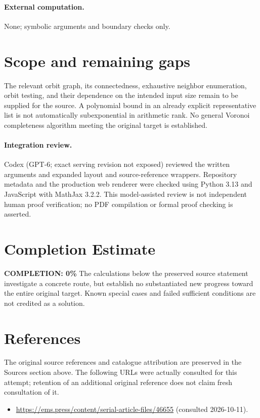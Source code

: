 \documentclass[11pt]{article}
\begin{document}
\paragraph{External computation.} None; symbolic arguments and boundary checks only.
\section{Scope and remaining gaps}
The relevant orbit graph, its connectedness, exhaustive neighbor enumeration, orbit testing, and their dependence on the intended input size remain to be supplied for the source. A polynomial bound in an already explicit representative list is not automatically subexponential in arithmetic rank. No general Voronoi completeness algorithm meeting the original target is established.
\paragraph{Integration review.} Codex (GPT-6; exact serving revision not exposed) reviewed the written arguments and expanded layout and source-reference wrappers. Repository metadata and the production web renderer were checked using Python 3.13 and JavaScript with MathJax 3.2.2. This model-assisted review is not independent human proof verification; no PDF compilation or formal proof checking is asserted.

\section{Completion Estimate}
\noindent\textbf{COMPLETION: 0\%}
The calculations below the preserved source statement investigate a concrete route,
but establish no substantiated new progress toward the entire original target.
Known special cases and failed sufficient conditions are not credited as a solution.
\section{References}
The original source references and catalogue attribution are preserved in the
Sources section above. The following URLs were actually consulted for this attempt;
retention of an additional original reference does not claim fresh consultation of it.
\begin{itemize}
\item \url{https://ems.press/content/serial-article-files/46655} (consulted 2026-10-11). 
\end{itemize}
\end{document}
